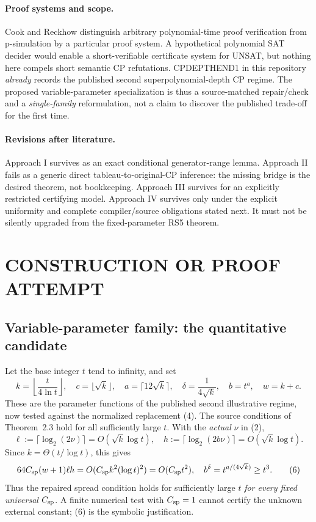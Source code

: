 \documentclass[11pt]{article}
\begin{document}
\paragraph{Proof systems and scope.}
Cook and Reckhow \cite{CookReckhow} distinguish arbitrary polynomial-time
proof verification from p-simulation by a particular proof system.
A hypothetical polynomial SAT decider would enable a short-verifiable
certificate system for UNSAT, but nothing here compels short
semantic CP refutations. CPDEPTHEND1 in this repository \emph{already}
records the published second superpolynomial-depth CP regime.
The proposed variable-parameter specialization is thus a source-matched
repair/check and a \emph{single-family} reformulation, not a claim to
discover the published trade-off for the first time.

\paragraph{Revisions after literature.}
Approach I survives as an exact conditional generator-range lemma.
Approach II fails as a generic direct tableau-to-original-CP inference:
the missing bridge is the desired theorem, not bookkeeping.
Approach III survives for an explicitly restricted certifying model.
Approach IV survives only under the explicit uniformity and complete
compiler/source obligations stated next. It must not be silently upgraded
from the fixed-parameter RS5 theorem.

\section{CONSTRUCTION OR PROOF ATTEMPT}
\subsection{Variable-parameter family: the quantitative candidate}
Let the base integer $t$ tend to infinity, and set
\[
 k=\left\lfloor\frac{t}{4\ln t}\right\rfloor,\quad
 c=\lfloor\sqrt{k}\rfloor,\quad
 a=\lceil12\sqrt{k}\rceil,\quad
 \delta=\frac1{4\sqrt{k}},\quad b=t^a,\quad w=k+c.       \tag{5}
\]
These are the parameter functions of the published second illustrative
regime, now tested against the normalized replacement (4). The source
conditions of Theorem~2.3 hold for all sufficiently large $t$.
With the \emph{actual} $\nu$ in (2),
\[
\ell:=\lceil\log_2(2\nu)\rceil=O(\sqrt{k}\log t),\quad
h:=\lceil\log_2(2b\nu)\rceil=O(\sqrt{k}\log t).
\]
Since $k=\Theta(t/\log t)$, this gives
\[
64C_{\rm sp}(w+1)\ell h
=O(C_{\rm sp}k^2(\log t)^2)=O(C_{\rm sp}t^2),
\quad
b^\delta=t^{a/(4\sqrt{k})}\ge t^3.                     \tag{6}
\]
Thus the repaired spread condition holds for sufficiently large $t$
\emph{for every fixed universal} $C_{\rm sp}$.
A finite numerical test with $C_{\rm sp}=1$ cannot certify the
unknown external constant; (6) is the symbolic justification.
\end{document}
